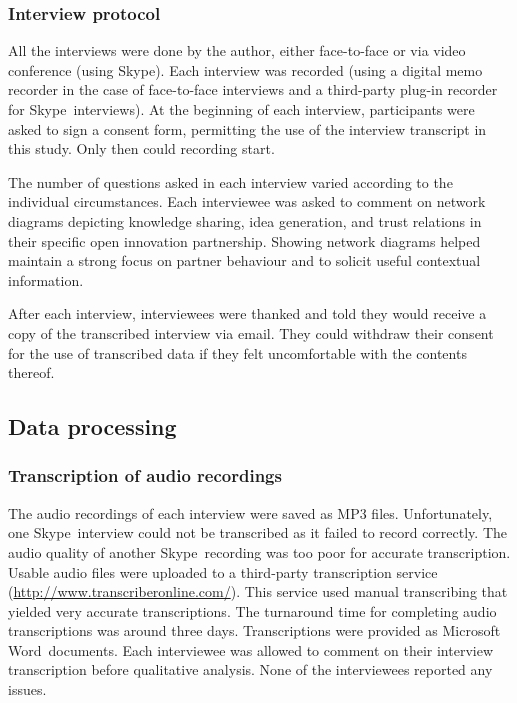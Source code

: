 \subsubsection{Interview protocol}

All the interviews were done by the author, either face-to-face or via video conference (using Skype\texttrademark). Each interview was recorded (using a digital memo recorder in the case of face-to-face interviews and a third-party plug-in recorder for Skype\texttrademark\ interviews). At the beginning of each interview, participants were asked to sign a consent form, permitting the use of the interview transcript in this study. Only then could recording start. \medskip

The number of questions asked in each interview varied according to the individual circumstances. Each interviewee was asked to comment on network diagrams depicting knowledge sharing, idea generation, and trust relations in their specific open innovation partnership. Showing network diagrams helped maintain a strong focus on partner behaviour and to solicit useful contextual information. \medskip

After each interview, interviewees were thanked and told they would receive a copy of the transcribed interview via email. They could withdraw their consent for the use of transcribed data if they felt uncomfortable with the contents thereof. 

\subsection{Data processing}

\subsubsection{Transcription of audio recordings}

The audio recordings of each interview were saved as MP3 files. Unfortunately, one Skype\texttrademark\ interview could not be transcribed as it failed to record correctly. The audio quality of another Skype\texttrademark\ recording was too poor for accurate transcription. Usable audio files were uploaded to a third-party transcription service (\url{http://www.transcriberonline.com/}). This service used manual transcribing that yielded very accurate transcriptions. The turnaround time for completing audio transcriptions was around three days. Transcriptions were provided as Microsoft Word\texttrademark\ documents. Each interviewee was allowed to comment on their interview transcription before qualitative analysis. None of the interviewees reported any issues. 

